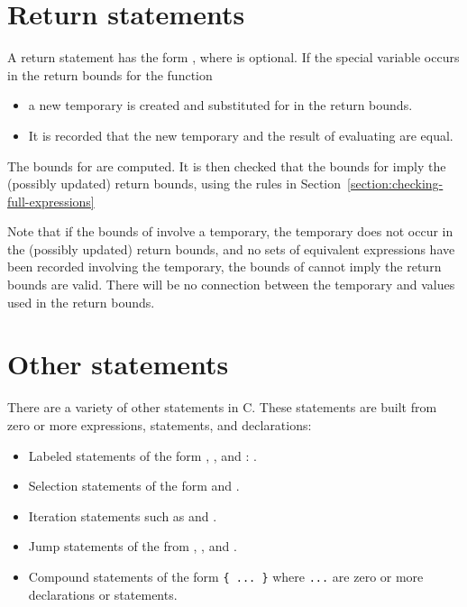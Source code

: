  \section{Return statements}
 \label{section:checking-return-statements}

A return statement has the form  , where 
is optional. If the special
variable  occurs in the return bounds
for the function
\begin{itemize}
\item a new temporary is created and substituted for
 in the return bounds.
\item  It is recorded that the new temporary and the result
of evaluating  are equal.
\end{itemize}
The bounds for  are computed.   It is then checked that
the bounds for  imply the (possibly updated) return
bounds, using  the rules in 
Section~\ref{section:checking-full-expressions}

Note that if the bounds of  involve a temporary,
the temporary does not occur in the (possibly updated) return bounds,
and no sets of equivalent expressions have been recorded involving the temporary,
the bounds of  cannot imply the return bounds are
valid.  There will be no connection between the temporary
and values used in the return bounds.

\section{Other statements}

There are a variety of other statements in C. These statements are built
from zero or more expressions, statements, and declarations:

\begin{itemize}
\item
  Labeled statements of the form 
   \code{:} ,
   , and  :
  .
\item
  Selection statements of the form \code{)} 
   
   and \code{)}
  .
\item
  Iteration statements such as \code{)}
   and 
  \code{;}  \code{;} 
   \code{)} .
\item
  Jump statements of the from  ,
  , and .
\item
  Compound statements of the form \lstinline|{ ... }| where \lstinline|...|
  are zero or more declarations or statements.
\end{itemize}

